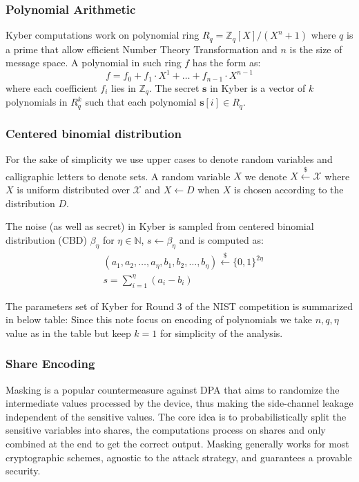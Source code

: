 \documentclass{llncs}
\begin{document}
\subsubsection{Polynomial Arithmetic}
Kyber computations work on polynomial ring $R_q = \mathbb{Z}_q[X]/(X^n + 1)$ where $q$ is a prime that allow efficient Number Theory Transformation and $n$ is the size of message space. 
A polynomial in such ring $f$ has the form as:
\begin{equation}
	f = f_0 + f_1\cdot X^1 + \dots + f_{n-1}\cdot X^{n-1}
\end{equation}
where each coefficient $f_i$ lies in $\mathbb{Z}_q$.
The secret $\mathbf{s}$ in Kyber is a vector of $k$ polynomials in $R^k_q$ such that each polynomial $\mathbf{s}[i] \in R_q$.

\subsubsection{Centered binomial distribution}

For the sake of simplicity we use upper cases to denote random variables and calligraphic letters to denote sets.
A random variable $X$ we denote $X \overset{\$}{\leftarrow} \mathcal{X}$ where $X$ is uniform distributed over $\mathcal{X}$ and $X \leftarrow D$ when $X$ is chosen according to the distribution $D$.

The noise (as well as secret) in Kyber is sampled from centered binomial distribution (CBD) $\beta_{\eta}$ for $\eta \in \mathbb{N}$, $s \leftarrow \beta_{\eta}$ and is computed as:
\begin{align*}
	&(a_1, a_2, \dots, a_{\eta}, b_1, b_2, \dots, b_{\eta}) \overset{\$}{\leftarrow} \{0, 1\}^{2\eta}\\
	&s = \sum_{i=1}^{\eta}(a_i-b_i)
\end{align*}

The parameters set of Kyber for Round 3 of the NIST competition is summarized in below table:
Since this note focus on encoding of polynomials we take $n, q, \eta$ value as in the table but keep $k=1$ for simplicity of the analysis.



\subsubsection{Share Encoding}


Masking is a popular countermeasure against DPA that aims to randomize the intermediate values processed by the device, thus making the side-channel leakage independent of the sensitive values. The core idea is to probabilistically split the sensitive variables into shares, the computations process on shares and only combined at the end to get the correct output. Masking generally works for most cryptographic schemes, agnostic to the attack strategy, and guarantees a provable security.
\end{document}
